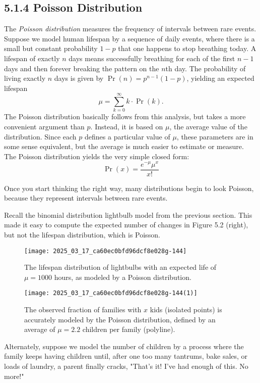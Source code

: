 \documentclass[10pt]{article}
\begin{document}
\subsection*{5.1.4 Poisson Distribution}
The \textit{Poisson distribution} measures the frequency of intervals between rare events. Suppose we model human lifespan by a sequence of daily events, where there is a small but constant probability $1-p$ that one happens to stop breathing today. A lifespan of exactly $n$ days means successfully breathing for each of the first $n-1$ days and then forever breaking the pattern on the $n$th day. The probability of living exactly $n$ days is given by $\operatorname{Pr}(n)=p^{n-1}(1-p)$, yielding an expected lifespan
\[
\mu=\sum_{k=0}^{\infty} k \cdot \operatorname{Pr}(k).
\]
The Poisson distribution basically follows from this analysis, but takes a more convenient argument than $p$. Instead, it is based on $\mu$, the average value of the distribution. Since each $p$ defines a particular value of $\mu$, these parameters are in some sense equivalent, but the average is much easier to estimate or measure. The Poisson distribution yields the very simple closed form:
\[
\operatorname{Pr}(x)=\frac{e^{-\mu} \mu^{x}}{x!}
\]

Once you start thinking the right way, many distributions begin to look Poisson, because they represent intervals between rare events.

Recall the binomial distribution lightbulb model from the previous section. This made it easy to compute the expected number of changes in Figure 5.2 (right), but not the lifespan distribution, which is Poisson. 

\begin{figure}[H]
\centering
\texttt{[image: 2025\_03\_17\_ca60ec0bfd96dcf8e028g-144]}
\caption{The lifespan distribution of lightbulbs with an expected life of $\mu=1000$ hours, as modeled by a Poisson distribution.}
\end{figure}

\begin{figure}[H]
\centering
\texttt{[image: 2025\_03\_17\_ca60ec0bfd96dcf8e028g-144(1)]}
\caption{The observed fraction of families with $x$ kids (isolated points) is accurately modeled by the Poisson distribution, defined by an average of $\mu=2.2$ children per family (polyline).}
\end{figure}

Alternately, suppose we model the number of children by a process where the family keeps having children until, after one too many tantrums, bake sales, or loads of laundry, a parent finally cracks, "That's it! I've had enough of this. No more!"
\end{document}
